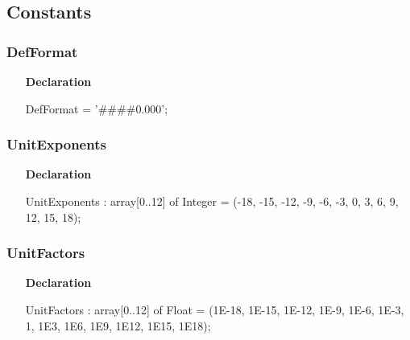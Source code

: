 \documentclass[12pt,a4paper,oneside]{report}
\newcommand{\declarationitem}[1]{\textbf{#1}}
\begin{document}
\subsection{Constants}
\subsubsection{DefFormat}
\label{lmunitsformat-DefFormat}
\begin{itemize}\item[\declarationitem{Declaration}\hfill]
	\begin{flushleft}
		\begin{ttfamily}
			DefFormat = '{\#}{\#}{\#}{\#}0.000';\end{ttfamily}
		
	\end{flushleft}
	
\end{itemize}
\subsubsection{UnitExponents}
\label{lmunitsformat-UnitExponents}
\begin{itemize}\item[\declarationitem{Declaration}\hfill]
	\begin{flushleft}
		\begin{ttfamily}
			UnitExponents : array[0..12] of Integer = (-18, -15, -12, -9, -6, -3, 0, 3, 6, 9, 12, 15, 18);\end{ttfamily}
		
	\end{flushleft}
	
\end{itemize}
\subsubsection{UnitFactors}
\label{lmunitsformat-UnitFactors}
\begin{itemize}\item[\declarationitem{Declaration}\hfill]
	\begin{flushleft}
		\begin{ttfamily}
			UnitFactors : array[0..12] of Float = (1E-18, 1E-15, 1E-12, 1E-9, 1E-6, 1E-3, 1, 1E3, 1E6, 1E9, 1E12, 1E15, 1E18);\end{ttfamily}
		
	\end{flushleft}
	
\end{itemize}
\end{document}
